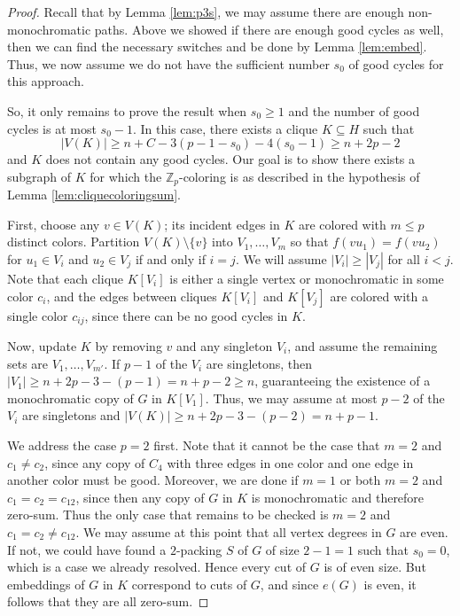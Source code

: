 \documentclass[11pt]{article}
\newcommand{\bZ}{\mathbb{Z}}
\newcommand\abs[1]{\left\lvert #1 \right\rvert}
\theoremstyle{definition}
\theoremstyle{plain}
\begin{document}
\begin{proof}
    Recall that by Lemma \ref{lem:p3s}, we may assume there are enough non-monochromatic paths. Above we showed if there are enough good cycles as well, then we can find the necessary switches and be done by Lemma \ref{lem:embed}. Thus, we now assume we do not have the sufficient number $s_0$ of good cycles for this approach.
    
    So, it only remains to prove the result when $s_0\geq 1$ and the number of good cycles is at most $s_0-1$. In this case, there exists a clique $K\subseteq H$ such that \[\abs{V(K)}\geq n+C-3(p-1-s_0)-4(s_0-1)\geq n+2p-2\] and $K$ does not contain any good cycles. Our goal is to show there exists a subgraph of $K$ for which the $\bZ_p$-coloring is as described in the hypothesis of Lemma \ref{lem:cliquecoloringsum}.
    
    First, choose any $v\in V(K)$; its incident edges in $K$ are colored with $m\leq p$ distinct colors. 
    Partition $V(K)\setminus\{v\}$ into $V_1,\ldots, V_m$ so that $f(vu_1)=f(vu_2)$ for $u_1\in V_i$ and $u_2\in V_j$ if and only if $i=j$. We will assume $|V_i|\geq |V_j|$ for all $i<j$.  Note that each clique $K[V_i]$ is either a single vertex or monochromatic in some color $c_i$, and  the edges between cliques $K[V_i]$ and $K[V_j]$ are colored with a single color $c_{ij}$, since there can be no good cycles in $K$.    
    
    Now, update $K$ by removing $v$ and any singleton $V_i$, and assume the remaining sets are $V_1,\ldots,V_{m'}$. If $p-1$ of the $V_i$ are singletons, then $|V_1|\geq n+2p-3-(p-1)=n+p-2\geq n$, guaranteeing the existence of a monochromatic copy of $G$ in $K[V_1]$. Thus, we may assume at most $p-2$ of the $V_i$ are singletons and $\abs{V(K)}\geq n+2p-3-(p-2)=n+p-1$. 

    We address the case $p=2$ first. Note that it cannot be the case that $m=2$ and $c_1\neq c_2$, since any copy of $C_4$ with three edges in one color and one edge in another color must be good. Moreover, we are done if $m=1$ or both $m=2$ and $c_1=c_2=c_{12}$, since then any copy of $G$ in $K$ is monochromatic and therefore zero-sum. Thus the only case that remains to be checked is $m=2$ and $c_1=c_2\neq c_{12}$. We may assume at this point that all vertex degrees in $G$ are even. If not, we could have found a $2$-packing $S$ of $G$ of size $2-1=1$ such that $s_0=0$, which is a case we already resolved. Hence every cut of $G$ is of even size. But embeddings of $G$ in $K$ correspond to cuts of $G$, and since $e(G)$ is even, it follows that they are all zero-sum.
    

\end{proof}
\end{document}
